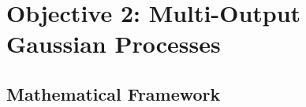 \section{Objective 2: Multi-Output Gaussian Processes}

\subsection{Mathematical Framework}

%	
%			
%			
%			
%			
%			
%				
%				
%			
%		
%				
%		


